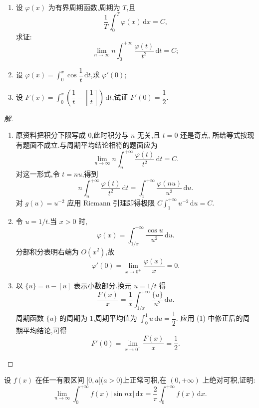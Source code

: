 \documentclass[../../数学分析培优讲义(答案版).tex]{subfiles}
\begin{document}
\begin{example}
\begin{enumerate}[label=(\arabic*)]
    \item 设 $\varphi(x)$ 为有界周期函数,周期为 $T$,且
    \[
        \dfrac{1}{T}\int_0^T\varphi(x)\,\mathrm{d}x=C,
    \]
    求证:
    \[
        \lim\limits_{n\to\infty}n\int_0^{+\infty}\dfrac{\varphi(t)}{t^2}\,\mathrm{d}t=C;
    \]
    \item 设 $\displaystyle\varphi(x)=\int_0^x\cos\dfrac{1}{t}\,\mathrm{d}t$,求 $\varphi'(0)$;
    \item 设 $\displaystyle F(x)=\int_0^x\left(\dfrac{1}{t}-\left[\dfrac{1}{t}\right]\right)\,\mathrm{d}t$,试证 $F'(0)=\dfrac{1}{2}$.
\end{enumerate}
\end{example}

\begin{proof}[解]
\begin{enumerate}[label=(\arabic*)]
    \item 原资料把积分下限写成 $0$,此时积分与 $n$ 无关,且 $t=0$ 还是奇点,
    所给等式按现有题面不成立.与周期平均结论相符的题面应为
    \[
        \lim\limits_{n\to\infty}n\int_n^{+\infty}\dfrac{\varphi(t)}{t^2}\,\mathrm{d}t=C.
    \]
    对这一形式,令 $t=nu$,得到
    \[
        n\int_n^{+\infty}\dfrac{\varphi(t)}{t^2}\,\mathrm{d}t
        =\int_1^{+\infty}\dfrac{\varphi(nu)}{u^2}\,\mathrm{d}u.
    \]
    对 $g(u)=u^{-2}$ 应用 Riemann 引理即得极限
    $C\displaystyle\int_1^{+\infty}u^{-2}\,\mathrm{d}u=C$.

    \item 令 $u=1/t$.当 $x>0$ 时,
    \[
        \varphi(x)=\int_{1/x}^{+\infty}\dfrac{\cos u}{u^2}\,\mathrm{d}u.
    \]
    分部积分表明右端为 $O(x^2)$,故
    \[
        \varphi'(0)=\lim\limits_{x\to0^+}\dfrac{\varphi(x)}{x}=0.
    \]

    \item 以 $\{u\}=u-[u]$ 表示小数部分.换元 $u=1/t$ 得
    \[
        \dfrac{F(x)}{x}
        =\dfrac{1}{x}\int_{1/x}^{+\infty}\dfrac{\{u\}}{u^2}\,\mathrm{d}u.
    \]
    周期函数 $\{u\}$ 的周期为 $1$,周期平均值为
    $\displaystyle\int_0^1u\,\mathrm{d}u=\dfrac{1}{2}$.
    应用 (1) 中修正后的周期平均结论,可得
    \[
        F'(0)=\lim\limits_{x\to0^+}\dfrac{F(x)}{x}=\dfrac{1}{2}.
    \]
\end{enumerate}
\end{proof}

\begin{example}
设 $f(x)$ 在任一有限区间 $\lbrack 0,a\rbrack$($a>0$)上正常可积,在 $(0,+\infty)$ 上绝对可积,证明:
\[
    \lim\limits_{n\to\infty}\int_0^{+\infty}f(x)|\sin nx|\,\mathrm{d}x
    =\dfrac{2}{\pi}\int_0^{+\infty}f(x)\,\mathrm{d}x.
\]
\end{example}
\end{document}
